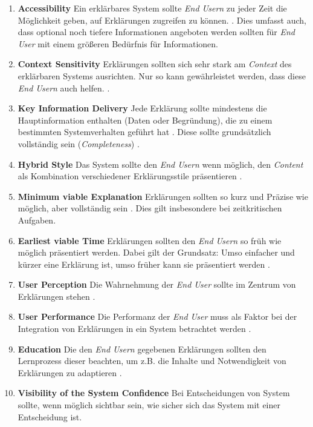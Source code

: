 \begin{enumerate}
    \item \textbf{Accessibility} Ein erklärbares System sollte \textit{End Usern} zu jeder Zeit die Möglichkeit geben, auf Erklärungen zugreifen zu können. \cite{wiegand2019drive, chazette_end-users_nodate, wiegand_id_2020, weitz_you_2019}. Dies umfasst auch, dass optional noch tiefere Informationen angeboten werden sollten für \textit{End User} mit einem größeren Bedürfnis für Informationen. \cite{martin_evaluating_2021}
    \item \textbf{Context Sensitivity} Erklärungen sollten sich sehr stark am \textit{Context} des erklärbaren Systems ausrichten. Nur so kann gewährleistet werden, dass diese \textit{End Usern} auch helfen. \cite{sato_context_nodate, rjoob_towards_2021,chazette_end-users_nodate}.
    \item \textbf{Key Information Delivery} Jede Erklärung sollte mindestens die Hauptinformation enthalten (Daten oder Begründung), die zu einem bestimmten Systemverhalten geführt hat \cite{martin_evaluating_2021}. Diese sollte grundsätzlich vollständig sein (\textit{Completeness}) \cite{riveiro_thats_2021}.
    \item \textbf{Hybrid Style} Das System sollte den \textit{End Usern} wenn möglich, den \textit{Content} als Kombination verschiedener Erklärungsstile präsentieren \cite{sato_action-triggering_2019, kunkel_let_2019, sato_action-triggering_2019, schrills_color_2020, lim_2009_assessing}.
    \item \textbf{Minimum viable Explanation} Erklärungen sollten so kurz und Präzise wie möglich, aber vollständig sein \cite{wiegand_id_2020, wiegand2019drive}. Dies gilt insbesondere bei zeitkritischen Aufgaben.
    \item \textbf{Earliest viable Time} Erklärungen sollten den \textit{End Usern} so früh wie möglich präsentiert werden. Dabei gilt der Grundsatz: Umso einfacher und kürzer eine Erklärung ist, umso früher kann sie präsentiert werden \cite{hleg2019policy, sovrano_modelling_2020}.
    \item \textbf{User Perception} Die Wahrnehmung der \textit{End User} sollte im Zentrum von Erklärungen stehen \cite{riveiro_thats_2021}.
    \item \textbf{User Performance} Die Performanz der \textit{End User} muss als Faktor bei der Integration von Erklärungen in ein System betrachtet werden \cite{riveiro_thats_2021}.
    \item \textbf{Education} Die den \textit{End Usern} gegebenen Erklärungen sollten den Lernprozess dieser beachten, um z.B. die Inhalte und Notwendigkeit von Erklärungen zu adaptieren \cite{wang_integration_2020}.
    \item \textbf{Visibility of the System Confidence} Bei Entscheidungen von System sollte, wenn möglich sichtbar sein, wie sicher sich das System mit einer Entscheidung ist. \cite{wiegand_id_2020, golledge1999wayfinding}
\end{enumerate}

